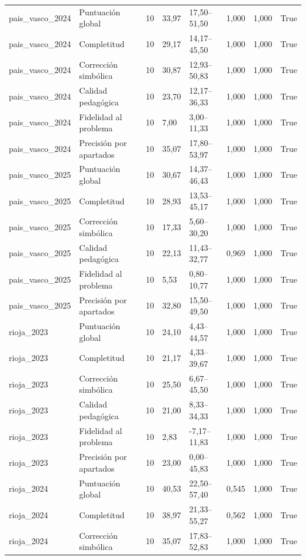 \begin{tabular}{llrllllr}
pais\_vasco\_2024 & Puntuación global & 10 & 33,97 & 17,50–51,50 & 1,000 & 1,000 & True \\
pais\_vasco\_2024 & Completitud & 10 & 29,17 & 14,17–45,50 & 1,000 & 1,000 & True \\
pais\_vasco\_2024 & Corrección simbólica & 10 & 30,87 & 12,93–50,83 & 1,000 & 1,000 & True \\
pais\_vasco\_2024 & Calidad pedagógica & 10 & 23,70 & 12,17–36,33 & 1,000 & 1,000 & True \\
pais\_vasco\_2024 & Fidelidad al problema & 10 & 7,00 & 3,00–11,33 & 1,000 & 1,000 & True \\
pais\_vasco\_2024 & Precisión por apartados & 10 & 35,07 & 17,80–53,97 & 1,000 & 1,000 & True \\
pais\_vasco\_2025 & Puntuación global & 10 & 30,67 & 14,37–46,43 & 1,000 & 1,000 & True \\
pais\_vasco\_2025 & Completitud & 10 & 28,93 & 13,53–45,17 & 1,000 & 1,000 & True \\
pais\_vasco\_2025 & Corrección simbólica & 10 & 17,33 & 5,60–30,20 & 1,000 & 1,000 & True \\
pais\_vasco\_2025 & Calidad pedagógica & 10 & 22,13 & 11,43–32,77 & 0,969 & 1,000 & True \\
pais\_vasco\_2025 & Fidelidad al problema & 10 & 5,53 & 0,80–10,77 & 1,000 & 1,000 & True \\
pais\_vasco\_2025 & Precisión por apartados & 10 & 32,80 & 15,50–49,50 & 1,000 & 1,000 & True \\
rioja\_2023 & Puntuación global & 10 & 24,10 & 4,43–44,57 & 1,000 & 1,000 & True \\
rioja\_2023 & Completitud & 10 & 21,17 & 4,33–39,67 & 1,000 & 1,000 & True \\
rioja\_2023 & Corrección simbólica & 10 & 25,50 & 6,67–45,50 & 1,000 & 1,000 & True \\
rioja\_2023 & Calidad pedagógica & 10 & 21,00 & 8,33–34,33 & 1,000 & 1,000 & True \\
rioja\_2023 & Fidelidad al problema & 10 & 2,83 & -7,17–11,83 & 1,000 & 1,000 & True \\
rioja\_2023 & Precisión por apartados & 10 & 23,00 & 0,00–45,83 & 1,000 & 1,000 & True \\
rioja\_2024 & Puntuación global & 10 & 40,53 & 22,50–57,40 & 0,545 & 1,000 & True \\
rioja\_2024 & Completitud & 10 & 38,97 & 21,33–55,27 & 0,562 & 1,000 & True \\
rioja\_2024 & Corrección simbólica & 10 & 35,07 & 17,83–52,83 & 1,000 & 1,000 & True \\

\end{tabular}
